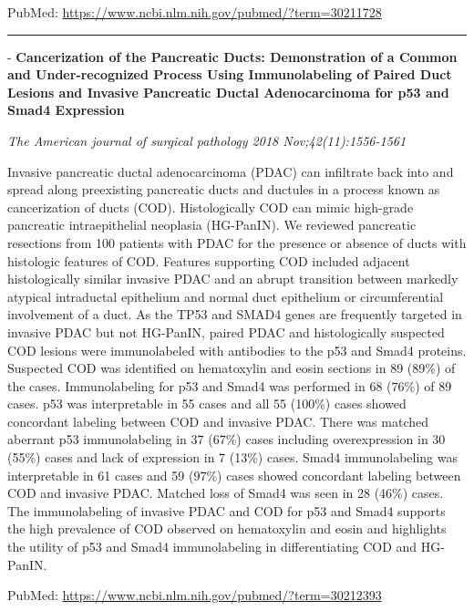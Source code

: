 \documentclass[]{article}
\begin{document}
PubMed: \url{https://www.ncbi.nlm.nih.gov/pubmed/?term=30211728}

{}

{}

\begin{center}\rule{0.5\linewidth}{\linethickness}\end{center}

 - \textbf{Cancerization of the Pancreatic Ducts: Demonstration of a
Common and Under-recognized Process Using Immunolabeling of Paired Duct
Lesions and Invasive Pancreatic Ductal Adenocarcinoma for p53 and Smad4
Expression}

\emph{The American journal of surgical pathology 2018
Nov;42(11):1556-1561}

Invasive pancreatic ductal adenocarcinoma (PDAC) can infiltrate back
into and spread along preexisting pancreatic ducts and ductules in a
process known as cancerization of ducts (COD). Histologically COD can
mimic high-grade pancreatic intraepithelial neoplasia (HG-PanIN). We
reviewed pancreatic resections from 100 patients with PDAC for the
presence or absence of ducts with histologic features of COD. Features
supporting COD included adjacent histologically similar invasive PDAC
and an abrupt transition between markedly atypical intraductal
epithelium and normal duct epithelium or circumferential involvement of
a duct. As the TP53 and SMAD4 genes are frequently targeted in invasive
PDAC but not HG-PanIN, paired PDAC and histologically suspected COD
lesions were immunolabeled with antibodies to the p53 and Smad4
proteins. Suspected COD was identified on hematoxylin and eosin sections
in 89 (89\%) of the cases. Immunolabeling for p53 and Smad4 was
performed in 68 (76\%) of 89 cases. p53 was interpretable in 55 cases
and all 55 (100\%) cases showed concordant labeling between COD and
invasive PDAC. There was matched aberrant p53 immunolabeling in 37
(67\%) cases including overexpression in 30 (55\%) cases and lack of
expression in 7 (13\%) cases. Smad4 immunolabeling was interpretable in
61 cases and 59 (97\%) cases showed concordant labeling between COD and
invasive PDAC. Matched loss of Smad4 was seen in 28 (46\%) cases. The
immunolabeling of invasive PDAC and COD for p53 and Smad4 supports the
high prevalence of COD observed on hematoxylin and eosin and highlights
the utility of p53 and Smad4 immunolabeling in differentiating COD and
HG-PanIN.

PubMed: \url{https://www.ncbi.nlm.nih.gov/pubmed/?term=30212393}

{}
\end{document}
